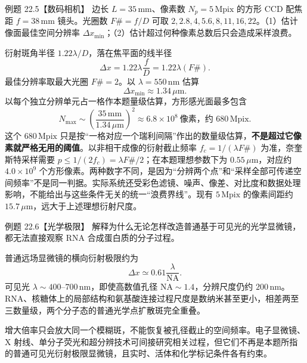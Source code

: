 \begin{origexamplebox}{例题 22.5【数码相机】}
边长 $L=35\,\mathrm{mm}$、像素数 $N_p=5\,\mathrm{Mpix}$ 的方形 CCD 配焦距 $f=38\,\mathrm{mm}$ 镜头。光圈数 $F\#=f/D$ 可取 $2,2.8,4,5.6,8,11,16,22$。（1）估计像面最佳空间分辨率 $\Delta x_{\min}$；（2）估计超过何种像素总数后只会造成采样浪费。
\end{origexamplebox}
\begin{xesolution}
衍射斑角半径 $1.22\lambda/D$，落在焦平面的线半径
\[
 \Delta x=1.22\lambda\frac fD=1.22\lambda(F\#).
\]
最佳分辨率取最大光圈 $F\#=2$。以 $\lambda=550\,\mathrm{nm}$ 估算
\[
 \boxed{\Delta x_{\min}\approx1.34\,\mu\mathrm m}.
\]
以每个独立分辨单元占一格作本题量级估算，方形感光面最多包含
\[
 N_{\max}\sim\left(\frac{35\,\mathrm{mm}}{1.34\,\mu\mathrm m}\right)^2
 \approx\boxed{6.8\times10^8\ \text{像素，约 }680\,\mathrm{Mpix}}.
\]
这个 $680\,\mathrm{Mpix}$ 只是按“一格对应一个瑞利间隔”作出的数量级估算，\textbf{不是超过它像素就严格无用的阈值}。以非相干成像的衍射截止频率 $f_c=1/(\lambda F\#)$ 为准，奈奎斯特采样需要 $p\le1/(2f_c)=\lambda F\#/2$；在本题理想参数下为 $0.55\,\mu\mathrm m$，对应约 $4.0\times10^9$ 个方形像素。两种数字不同，是因为“分辨两个点”和“采样全部可传递空间频率”不是同一判据。实际系统还受彩色滤镜、噪声、像差、对比度和数据处理影响，不能给出与这些条件无关的统一“浪费界线”。现有 $5\,\mathrm{Mpix}$ 的像素间距约 $15.7\,\mu\mathrm m$，远大于上述理想衍射尺度。
\end{xesolution}

\MolecularLimitDiagram

\begin{origexamplebox}{例题 22.6【光学极限】}
解释为什么无论怎样改造普通基于可见光的光学显微镜，都无法直接观察 RNA 合成蛋白质的分子过程。
\end{origexamplebox}
\begin{xesolution}
普通远场显微镜的横向衍射极限约为
\[
 \Delta x\simeq0.61\frac{\lambda}{\mathrm{NA}}.
\]
可见光 $\lambda\sim400$--$700\,\mathrm{nm}$，即使高数值孔径 $\mathrm{NA}\sim1.4$，分辨尺度仍约 $200\,\mathrm{nm}$。RNA、核糖体上的局部结构和氨基酸连接过程尺度是数纳米甚至更小，相差两至三数量级，两个分子态的普通光学点扩散斑完全重叠。

增大倍率只会放大同一个模糊斑，不能恢复被孔径截止的空间频率。电子显微镜、X 射线、单分子荧光和超分辨技术可间接研究相关过程，但它们不再是本题所指的普通可见光衍射极限显微镜，且实时、活体和化学标记条件各有约束。
\end{xesolution}

